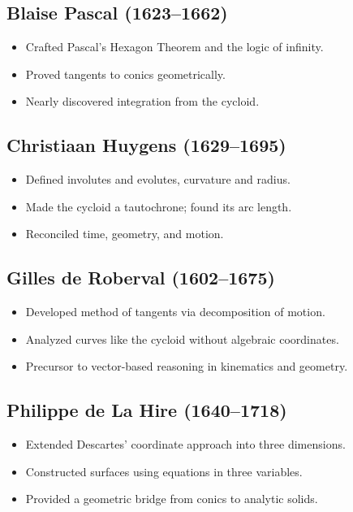 \documentclass[9pt]{article}
\begin{document}
\subsection*{Blaise Pascal (1623–1662)}
\begin{itemize}
  \item Crafted Pascal’s Hexagon Theorem and the logic of infinity.
  \item Proved tangents to conics geometrically.
  \item Nearly discovered integration from the cycloid.
\end{itemize}

\subsection*{Christiaan Huygens (1629–1695)}
\begin{itemize}
  \item Defined involutes and evolutes, curvature and radius.
  \item Made the cycloid a tautochrone; found its arc length.
  \item Reconciled time, geometry, and motion.
\end{itemize}

\subsection*{Gilles de Roberval (1602–1675)}
\begin{itemize}
  \item Developed method of tangents via decomposition of motion.
  \item Analyzed curves like the cycloid without algebraic coordinates.
  \item Precursor to vector-based reasoning in kinematics and geometry.
\end{itemize}

\subsection*{Philippe de La Hire (1640–1718)}
\begin{itemize}
  \item Extended Descartes' coordinate approach into three dimensions.
  \item Constructed surfaces using equations in three variables.
  \item Provided a geometric bridge from conics to analytic solids.
\end{itemize}
\end{document}

